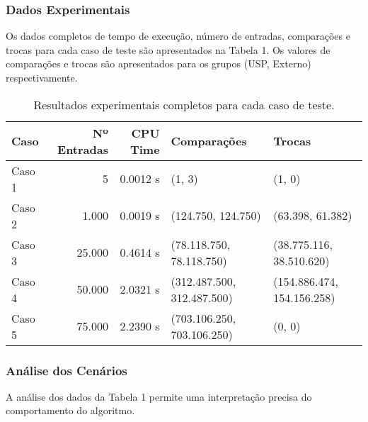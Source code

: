 \subsubsection{Dados Experimentais}
Os dados completos de tempo de execução, número de entradas, comparações e trocas para cada caso de teste são apresentados na Tabela 1. Os valores de comparações e trocas são apresentados para os grupos (USP, Externo) respectivamente.

\begin{table}[h!]
\centering
\begin{tabular}{|l|r|r|l|l|}
\hline
\textbf{Caso} & \textbf{Nº Entradas} & \textbf{CPU Time} & \textbf{Comparações} & \textbf{Trocas} \\ \hline
Caso 1 & 5 & 0.0012 s & (1, 3) & (1, 0) \\ \hline
Caso 2 & 1.000 & 0.0019 s & (124.750, 124.750) & (63.398, 61.382) \\ \hline
Caso 3 & 25.000 & 0.4614 s & (78.118.750, 78.118.750) & (38.775.116, 38.510.620) \\ \hline
Caso 4 & 50.000 & 2.0321 s & (312.487.500, 312.487.500) & (154.886.474, 154.156.258) \\ \hline
Caso 5 & 75.000 & 2.2390 s & (703.106.250, 703.106.250) & (0, 0) \\ \hline
\end{tabular}
\caption{Resultados experimentais completos para cada caso de teste.}
\label{tab:dados_completos}
\end{table}

\vspace{3cm}


\subsubsection{Análise dos Cenários}
A análise dos dados da Tabela 1 permite uma interpretação precisa do comportamento do algoritmo.

